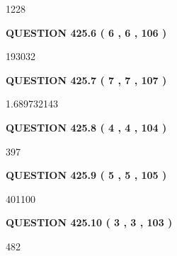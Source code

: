 \documentclass{ctexart}
\begin{document}
  
 
 
\noindent{}

1228
 
 
  
\vspace{0.2in}
  
{\textbf{\Large{QUESTION
425.6 
 ( 6 , 6 , 106 )
}}}
  
  
 
 
\noindent{}

193032
 
 
  
\vspace{0.2in}
  
{\textbf{\Large{QUESTION
425.7 
 ( 7 , 7 , 107 )
}}}
  
  
 
 
\noindent{}

1.689732143
 
 
  
\vspace{0.2in}
  
{\textbf{\Large{QUESTION
425.8 
 ( 4 , 4 , 104 )
}}}
  
  
 
 
\noindent{}

397
 
 
  
\vspace{0.2in}
  
{\textbf{\Large{QUESTION
425.9 
 ( 5 , 5 , 105 )
}}}
  
  
 
 
\noindent{}

401100
 
 
  
\vspace{0.2in}
  
{\textbf{\Large{QUESTION
425.10 
 ( 3 , 3 , 103 )
}}}
  
  
 
 
\noindent{}

482
 
 
   
\end{document}
